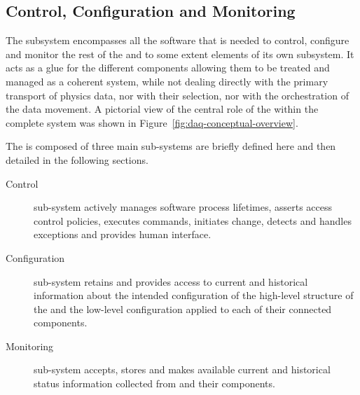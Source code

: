 


\subsection{Control, Configuration and Monitoring}
\label{sec:fd-daq:design-run-control}


The  subsystem encompasses all the software that is needed to control, configure and monitor the rest of the  and to some extent elements of its own subsystem. 
It acts as a glue for the different  components allowing them to be treated and managed as a coherent system, while not dealing directly with the primary transport of physics data, nor with their selection, nor with the orchestration of the data movement. 
A pictorial view of the central role of the  within the complete  system was shown in Figure~\ref{fig:daq-conceptual-overview}.

The  is composed of three main sub-systems are briefly defined here and then detailed in the following sections.
\begin{description}

\item[Control] sub-system actively manages  software process lifetimes, asserts access control policies, executes commands, initiates change, detects and handles exceptions and provides human interface.


\item[Configuration] sub-system retains and provides access to current and historical information about the intended configuration of the high-level structure of the  and the low-level configuration applied to each of their connected components.

\item[Monitoring] sub-system accepts, stores and makes available current and historical status information collected from  and their components.

\end{description}

